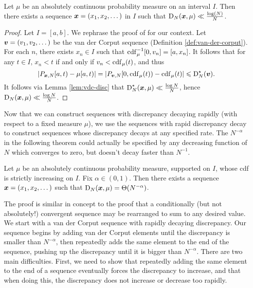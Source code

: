 \begin{theorem}\label{thm:van-der-corput}
Let $\mu$ be an absolutely continuous probability measure on an interval $I$. 
Then there exists a sequence ${\boldsymbol x}=(x_1,x_2,\dots)$ in $I$ such that 
$\operatorname{D}_N({\boldsymbol x},\mu) \ll \frac{\log(N)}{N}$. 
\end{theorem}
\begin{proof}
Let $I = [a,b]$. We rephrase the proof of 
\cite[Ch.~2 Lem.~4.2]{kuipers-niederreiter-1974} for our context. Let 
${\boldsymbol v} = (v_1,v_2,\dots)$ be the van der Corput sequence (Definition 
\ref{def:van-der-corput}). For each $n$, there exists $x_n\in I$ such that 
$\operatorname{cdf}_\mu^{-1}[0,v_n] = [a,x_n]$. It follows that for any $t\in I$, $x_n < t$ 
if and only if $v_n < \operatorname{cdf}_\mu(t)$, and thus 
\[
	\left|P_{{\boldsymbol x},N}[a,t) - \mu[a,t)\right| = \left|P_{{\boldsymbol v},N}[0,\operatorname{cdf}_\mu(t)) - \operatorname{cdf}_\mu(t)\right| \leqslant \operatorname{D}_N^\star({\boldsymbol v}) .
\]
It follows via Lemma \ref{lem:vdc-disc} that 
$\operatorname{D}_N^\star({\boldsymbol x},\mu) \ll \frac{\log N}{N}$, hence 
$\operatorname{D}_N({\boldsymbol x},\mu) \ll \frac{\log N}{N}$. 
\end{proof}

Now that we can construct sequences with discrepancy decaying rapidly (with 
respect to a fixed measure $\mu$), we use the sequences with rapid discrepancy 
decay to construct sequences whose discrepancy decays at any specified rate. 
The $N^{-\alpha}$ in the following theorem could actually be specified by any 
decreasing function of $N$ which converges to zero, but doesn't decay faster 
than $N^{-1}$. 

\begin{theorem}\label{thm:discrepancy-arbitrary}
Let $\mu$ be an absolutely continuous probability measure, supported on $I$, 
whose cdf is strictly increasing on $I$. Fix $\alpha\in (0,1)$. Then there 
exists a sequence ${\boldsymbol x}=(x_1,x_2,\dots)$ such that 
$\operatorname{D}_N({\boldsymbol x},\mu) = \Theta(N^{-\alpha})$. 
\end{theorem}

The proof is similar in concept to the proof that a conditionally (but not 
absolutely!) convergent sequence may be rearranged to sum to any desired value. 
We start with a van der Corput sequence with rapidly decaying discrepancy. Our 
sequence begins by adding van der Corput elements until the discrepancy is 
smaller than $N^{-\alpha}$, then repeatedly adds the same element to the end 
of the sequence, pushing up the discrepancy until it is bigger than 
$N^{-\alpha}$. There are two main difficulties. First, we need to show that 
repeatedly adding the same element to the end of a sequence eventually forces 
the discrepancy to increase, and that when doing this, the discrepancy does not 
increase or decrease too rapidly. 

